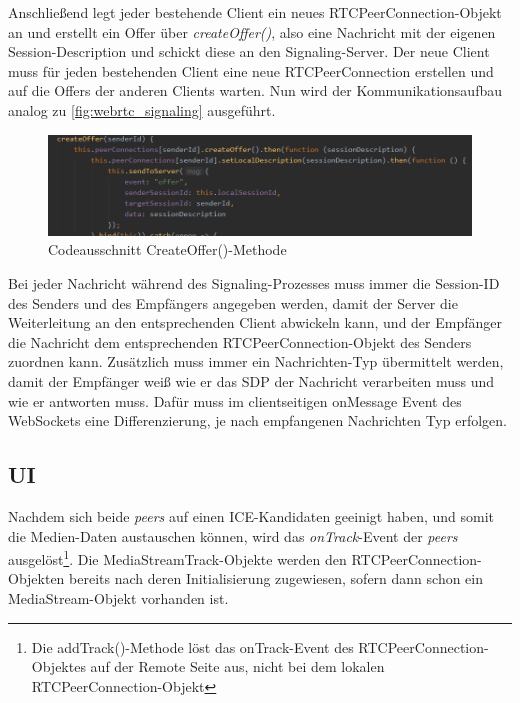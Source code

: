 Anschließend legt jeder bestehende Client ein neues RTCPeerConnection-Objekt an und erstellt ein Offer über \textit{createOffer()}, also
eine Nachricht mit der eigenen Session-Description und schickt diese an den Signaling-Server.
Der neue Client muss für jeden bestehenden Client eine neue RTCPeerConnection erstellen und auf die Offers der anderen Clients warten.
Nun wird der Kommunikationsaufbau analog zu \autoref{fig:webrtc_signaling} ausgeführt.


\begin{figure}[h]
    \includegraphics[width=1\textwidth]{resources/createOfferBeispiel.png}
    \caption{Codeausschnitt CreateOffer()-Methode}
    \label{fig:createOffer}
\end{figure}

Bei jeder Nachricht während des Signaling-Prozesses muss immer die Session-ID des Senders und des Empfängers angegeben werden, damit
der Server die Weiterleitung an den entsprechenden Client abwickeln kann, und der Empfänger die Nachricht dem entsprechenden
RTCPeerConnection-Objekt des Senders zuordnen kann.
Zusätzlich muss immer ein Nachrichten-Typ übermittelt werden, damit der Empfänger weiß wie er das SDP der Nachricht verarbeiten muss und wie er antworten muss.
Dafür muss im clientseitigen onMessage Event des WebSockets eine Differenzierung, je nach empfangenen Nachrichten Typ erfolgen.
\newpage

\subsection{UI}
\label{subsec:DatenaustauschUI}
Nachdem sich beide \textit{peers} auf einen ICE-Kandidaten geeinigt haben, und somit die Medien-Daten austauschen können,
wird das \textit{onTrack}-Event der \textit{peers} ausgelöst\footnote{Die addTrack()-Methode löst das onTrack-Event des RTCPeerConnection-Objektes
auf der Remote Seite aus, nicht bei dem lokalen RTCPeerConnection-Objekt}.
Die MediaStreamTrack-Objekte werden den RTCPeerConnection-Objekten bereits nach deren Initialisierung zugewiesen, sofern dann schon ein MediaStream-Objekt
vorhanden ist.

